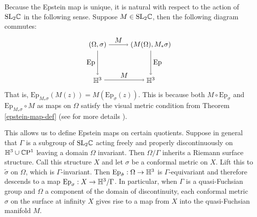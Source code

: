 Because the Epstein map is unique, it is natural with respect to the action of $\mathrm{SL}_2\mathbb{C}$ in the following sense. 
Suppose $M \in \mathrm{SL}_2\mathbb{C}$, then the following diagram commutes:
\[
\begin{tikzpicture}[scale=0.9]
\node (1) at (0,2) {$(\Omega,\sigma)$};
\node (2) at (3,2) {$(M(\Omega),M_*\sigma)$};
\node (3) at (0,0) {$\H^3$};
\node (4) at (3,0) {$\H^3$};


\draw[->] (1) to node [above] {$M$} (2);
\draw[->] (1) to node [left] {$\mathrm{Ep}$} (3);
\draw[->] (3) to node [above] {$M$} (4);
\draw[->] (2) to node [right] {$\mathrm{Ep}$} (4);
\end{tikzpicture}
\]
That is, $\mathrm{Ep}_{M_*\sigma}(M(z)) = M( \mathrm{Ep}_{\sigma}(z))$. 
This is because both $M \circ \mathrm{Ep}_\sigma$ and $\mathrm{Ep}_{M_*\sigma} \circ M$ as maps on $\Omega$ satisfy the visual metric condition from Theorem \ref{epstein-map-def} (see \cite{anderson1998} for more details ).

This allows us to define Epstein maps on certain quotients. 
Suppose in general that $\Gamma$ is a subgroup of $\mathrm{SL}_2\mathbb{C}$ acting freely and properly discontinuously on $\mathbb{H}^3 \cup \mathbb{C}\mathrm{P}^1$ leaving a domain $\Omega$ invariant. 
Then $\Omega/\Gamma$ inherits a Riemann surface structure. 
Call this structure $X$ and let $\sigma$ be a conformal metric  on $X$.
Lift this to $\tilde{\sigma}$ on $\Omega$, which is $\Gamma$-invariant. 
Then $\mathrm{Ep}_{\tilde{\sigma}}: \Omega \to \mathbb{H}^3$ is $\Gamma$-equivariant and therefore descends to a map $\mathrm{Ep}_\sigma : X \to \mathbb{H}^3/ \Gamma$. 
In particular, when $\Gamma$ is a quasi-Fuchsian group and $\Omega$ a component of the domain of discontinuity, each conformal metric $\sigma$ on the surface at infinity $X$ gives rise to a map from $X$ into the quasi-Fuchsian manifold $M$.

